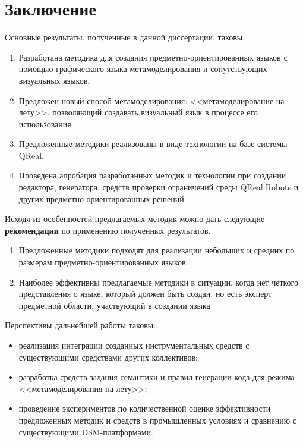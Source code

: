 \chapter*{Заключение}
Основные результаты, полученные в данной диссертации, таковы.
\begin{enumerate}
	\item Разработана методика для создания предметно-ориентированных языков с помощью 
		графического языка метамоделирования и сопутствующих визуальных языков.
	\item Предложен новый способ метамоделирования: <<метамоделирование на лету>>, позволяющий
		создавать визуальный язык в процессе его использования.
	\item Предложенные методики реализованы в виде технологии на базе системы QReal.
	\item Проведена апробация разработанных методик и технологии при создании редактора, 
		генератора, средств проверки ограничений среды QReal:Robots и других предметно-ориентированных 
		решений.
\end{enumerate}

Исходя из особенностей предлагаемых методик можно дать следующие \textbf{рекомендации} 
по применению полученных результатов.
\begin{enumerate}
	\item Предложенные методики подходят для реализации небольших и средних по размерам 
		предметно-ориентированных языков.
	\item Наиболее эффективны предлагаемые методики в ситуации, когда нет чёткого представления
		о языке, который должен быть создан, но есть эксперт предметной области, участвующий
		в создании языка
\end{enumerate}

Перспективы дальнейшей работы таковы:.
\begin{itemize}
	\item реализация интеграции созданных инструментальных средств с существующими 
		средствами других коллективов;
	\item разработка средств задания семантики и правил генерации кода для режима 
		<<метамоделирования на лету>>;
	\item проведение экспериментов по количественной оценке эффективности предложенных 
		методик и средств в промышленных условиях и сравнению с существующими DSM-платформами.
\end{itemize}
